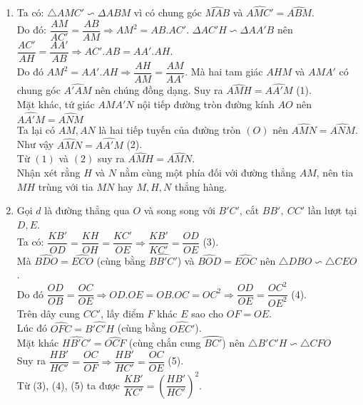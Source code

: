 \begin{ex}
{\begin{enumerate}
{}
Do đó $MM' \parallel AA'$.\\
Mặt khác $BC\perp AA'$ nên $MM'\perp BC$. Vì $BC$ là đường kính của đường tròn $(O)$ mà $BC$ vuông góc với dây cung $MM'$ nên $BC$ là đường trung trực của $MM'.$
\item Ta có: $\triangle AM{C}'\backsim \Delta ABM$ vì có chung góc $\widehat{MAB}$ và $\widehat{AMC'}=\widehat{ABM}$.\\
Do đó: $\dfrac{AM}{AC'}=\dfrac{AB}{AM}\Rightarrow AM^2=AB.AC'$.
$\Delta A{C}'H\backsim \Delta A{A'}B$ nên $\dfrac{AC'}{AH}=\dfrac{AA'}{AB}\Rightarrow AC'.AB=AA'.AH$.\\
Do đó $AM^2=AA'.AH\Rightarrow \dfrac{AH}{AM}=\dfrac{AM}{AA'}$. Mà hai tam giác $AHM$ và $AMA'$ có chung góc $\widehat{A'AM}$ nên chúng đồng dạng. Suy ra $\widehat{AMH}=\widehat{AA'M}$ (1).\\
Mặt khác, tứ giác $AMA'N$ nội tiếp đường tròn đường kính $AO$ nên $\widehat{AA'M}=\widehat{ANM}$\\
Ta lại có $AM, AN$ là hai tiếp tuyến của đường tròn $(O)$ nên $\widehat{AMN}=\widehat{ANM}$.\\
Như vậy $\widehat{AMN}=\widehat{AA'M}$ (2).\\
Từ $(1)$ và $(2)$ suy ra $\widehat{AMH}=\widehat{AMN}$.\\
Nhận xét rằng $H$ và $N$ nằm cùng một phía đối với đường thẳng $AM$, nên tia $MH$ trùng với tia $MN$ hay
$M, H, N$ thẳng hàng.
\item Gọi $d$ là đường thẳng qua $O$ và song song với $B'C'$, cắt $BB',\ CC'$ lần lượt tại $D,E$.\\
Ta có: $\dfrac{KB'}{OD}=\dfrac{KH}{OH}=\dfrac{KC'}{OE}\Rightarrow \dfrac{KB'}{KC'}=\dfrac{OD}{OE}$ (3).\\
Mà $\widehat{BDO}=\widehat{ECO}$ (cùng bằng $\widehat{BB'C'}$) và $\widehat{BOD}=\widehat{EOC}$ nên $\triangle DBO\backsim \triangle CEO$.\\
Do đó $\dfrac{OD}{OB}=\dfrac{OC}{OE}\Rightarrow OD.OE=OB.OC=OC^2\Rightarrow \dfrac{OD}{OE}=\dfrac{OC^2}{OE^2}$ (4).\\
Trên dây cung $CC'$, lấy điểm $F$ khác $E$ sao cho $OF=OE$.\\
Lúc đó $\widehat{OFC}=\widehat{B'C'H}$ (cùng bằng $\widehat{OEC'}$).\\
Mặt khác $\widehat{HB'C'}=\widehat{OCF}$ (cùng chắn cung $\wideparen{BC'}$) nên $\triangle {B}'{C}'H\backsim \triangle CFO$\\
Suy ra $\dfrac{HB'}{HC'}=\dfrac{OC}{OF}\Rightarrow \dfrac{HB'}{HC'}=\dfrac{OC}{OE}$ (5).\\
Từ (3), (4), (5) ta được $\dfrac{KB'}{KC'}={\left(\dfrac{HB'}{HC'}\right)}^2$.
\end{enumerate}
}
\end{ex}
